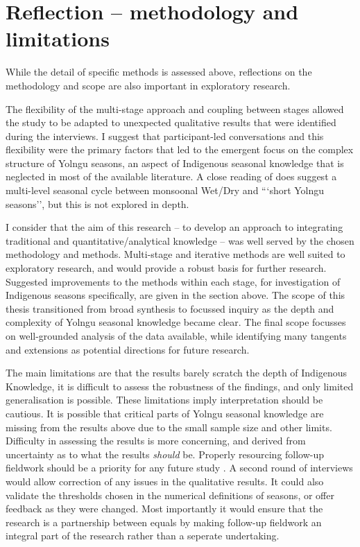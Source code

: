 \section{Reflection -- methodology and limitations}
\label{sec:disc-reflection}

While the detail of specific methods is assessed above, reflections on the
methodology and scope are also important in exploratory research.

The flexibility of the multi-stage approach and coupling between stages
allowed the study to be adapted to unexpected qualitative results that were
identified during the interviews.  I suggest
that participant-led conversations and this flexibility were the primary
factors that led to the emergent focus on the complex structure of
Yolngu seasons, an aspect of Indigenous seasonal knowledge that is neglected
in most of the available literature.  A close reading of \citet[][eg. p89]{barber2005}
does suggest a multi-level seasonal cycle between monsoonal Wet/Dry and
```short Yolngu seasons'', but this is not explored in depth.

I consider that the aim of this research -- to develop an approach to
integrating traditional and quantitative/analytical knowledge -- was well
served by the chosen methodology and methods.  Multi-stage and iterative
methods are well suited to exploratory research, and would provide a robust
basis for further research.  Suggested improvements to the methods within
each stage, for investigation of Indigenous seasons specifically, are given
in the section above.  The scope of this thesis transitioned from broad
synthesis to focussed inquiry as the depth and complexity of Yolngu seasonal
knowledge became clear.  The final scope focusses on well-grounded analysis
of the data available, while identifying many tangents and extensions as
potential directions for future research.

The main limitations are that the results barely scratch
the depth of Indigenous Knowledge, it is difficult to assess the robustness
of the findings, and only limited generalisation is possible.  These
limitations imply interpretation should be cautious.  It is possible that
critical parts of Yolngu seasonal knowledge are missing from the results
above due to the small sample size and other limits.
%
Difficulty in assessing the results is more concerning, and derived from
uncertainty as to what the results \textit{should} be.   Properly resourcing
follow-up fieldwork should be a priority for any future study
\citep[see eg.][on engagemnt plans]{jackson2015}.  A second round
of interviews would allow correction of any issues in the qualitative results.
It could also validate the thresholds chosen in the numerical definitions of
seasons, or offer feedback as they were changed.  Most importantly it would
ensure that the research is a partnership between equals by making follow-up
fieldwork an integral part of the research rather than a seperate undertaking.

